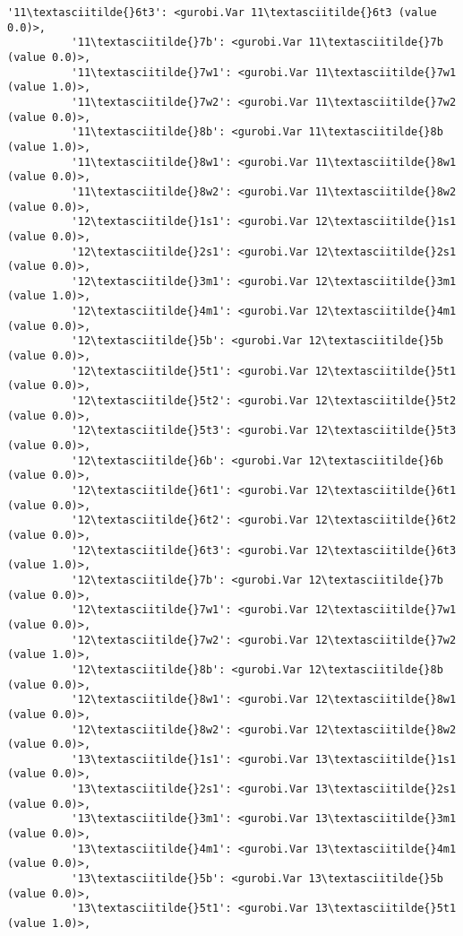 \documentclass[11pt]{article}
\begin{document}
\begin{Verbatim}[commandchars=\\\{\}]
          '11\textasciitilde{}6t3': <gurobi.Var 11\textasciitilde{}6t3 (value 0.0)>,
          '11\textasciitilde{}7b': <gurobi.Var 11\textasciitilde{}7b (value 0.0)>,
          '11\textasciitilde{}7w1': <gurobi.Var 11\textasciitilde{}7w1 (value 1.0)>,
          '11\textasciitilde{}7w2': <gurobi.Var 11\textasciitilde{}7w2 (value 0.0)>,
          '11\textasciitilde{}8b': <gurobi.Var 11\textasciitilde{}8b (value 1.0)>,
          '11\textasciitilde{}8w1': <gurobi.Var 11\textasciitilde{}8w1 (value 0.0)>,
          '11\textasciitilde{}8w2': <gurobi.Var 11\textasciitilde{}8w2 (value 0.0)>,
          '12\textasciitilde{}1s1': <gurobi.Var 12\textasciitilde{}1s1 (value 0.0)>,
          '12\textasciitilde{}2s1': <gurobi.Var 12\textasciitilde{}2s1 (value 0.0)>,
          '12\textasciitilde{}3m1': <gurobi.Var 12\textasciitilde{}3m1 (value 1.0)>,
          '12\textasciitilde{}4m1': <gurobi.Var 12\textasciitilde{}4m1 (value 0.0)>,
          '12\textasciitilde{}5b': <gurobi.Var 12\textasciitilde{}5b (value 0.0)>,
          '12\textasciitilde{}5t1': <gurobi.Var 12\textasciitilde{}5t1 (value 0.0)>,
          '12\textasciitilde{}5t2': <gurobi.Var 12\textasciitilde{}5t2 (value 0.0)>,
          '12\textasciitilde{}5t3': <gurobi.Var 12\textasciitilde{}5t3 (value 0.0)>,
          '12\textasciitilde{}6b': <gurobi.Var 12\textasciitilde{}6b (value 0.0)>,
          '12\textasciitilde{}6t1': <gurobi.Var 12\textasciitilde{}6t1 (value 0.0)>,
          '12\textasciitilde{}6t2': <gurobi.Var 12\textasciitilde{}6t2 (value 0.0)>,
          '12\textasciitilde{}6t3': <gurobi.Var 12\textasciitilde{}6t3 (value 1.0)>,
          '12\textasciitilde{}7b': <gurobi.Var 12\textasciitilde{}7b (value 0.0)>,
          '12\textasciitilde{}7w1': <gurobi.Var 12\textasciitilde{}7w1 (value 0.0)>,
          '12\textasciitilde{}7w2': <gurobi.Var 12\textasciitilde{}7w2 (value 1.0)>,
          '12\textasciitilde{}8b': <gurobi.Var 12\textasciitilde{}8b (value 0.0)>,
          '12\textasciitilde{}8w1': <gurobi.Var 12\textasciitilde{}8w1 (value 0.0)>,
          '12\textasciitilde{}8w2': <gurobi.Var 12\textasciitilde{}8w2 (value 0.0)>,
          '13\textasciitilde{}1s1': <gurobi.Var 13\textasciitilde{}1s1 (value 0.0)>,
          '13\textasciitilde{}2s1': <gurobi.Var 13\textasciitilde{}2s1 (value 0.0)>,
          '13\textasciitilde{}3m1': <gurobi.Var 13\textasciitilde{}3m1 (value 0.0)>,
          '13\textasciitilde{}4m1': <gurobi.Var 13\textasciitilde{}4m1 (value 0.0)>,
          '13\textasciitilde{}5b': <gurobi.Var 13\textasciitilde{}5b (value 0.0)>,
          '13\textasciitilde{}5t1': <gurobi.Var 13\textasciitilde{}5t1 (value 1.0)>,

\end{Verbatim}
\end{document}

